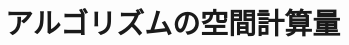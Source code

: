 \begin{comment}
	    \begin{minipage}[b]{0.5\hsize}
	    \begin{center}
	\caption*{バックトラック適用後
		}
	\begin{tikzpicture}[every node/.style={circle,draw=black,fill=white,black} ]
	    \node(s) {};
		\node[below =of s](a){};
		\node[left=of a](b){};
		\node[right =of a](c){};
		\node[ rectangle,above =1mm of s , draw = white ](ss){ \small{$ V_{\mathrm{e} }:= V_{\mathrm{e} } \cup \{p\} $ } };
		\node[ rectangle,above =7mm of s , draw = white ](s2){ \small{$R := R' \cup V_{\mathrm{d} }-\{p\} $ } };
	    	\foreach \u / \v in{s/a,s/b,s/c}
			\draw[-] (\u)--(\v);
	\end{tikzpicture}
	    \end{center}
	\end{minipage}


\end{tabular}
    \caption{提案手法の動作\\
	    }
    \label{fig:child}
	
\end{figure}



\end{comment}



\section{アルゴリズムの空間計算量}
\label{sec:alg-mem}

